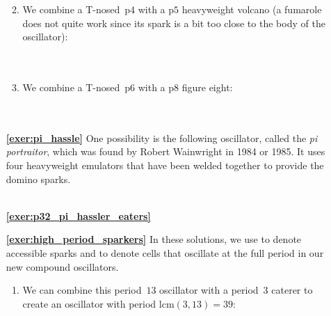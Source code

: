 \begin{multicols}{2}
\begin{itemize}[leftmargin=0em]
\begin{enumerate}[leftmargin=1.5em,label=\bf\color{ocre}(\alph*)]
			
			\item We combine a T-nosed~p$4$ with a p$5$ heavyweight volcano (a fumarole does not quite work since its spark is a bit too close to the body of the oscillator): \\[-0.6em]
			
			 \\[-0.8em]
			
			 \\
			
			\item We combine a T-nosed~p$6$ with a p$8$ figure eight: \\[-0.6em]
			
			 \\[-0.8em]
			
			 \\
		\end{enumerate}
		
		
		\item[\bf\color{ocre}\sffamily\ref{exer:pi_hassle}] One possibility is the following oscillator, called the \emph{pi portraitor}, which was found by Robert Wainwright in 1984 or 1985. It uses four heavyweight emulators that have been welded together to provide the domino sparks. \\[-0.6em]
		
		 \\
		
		
		\item[\bf\color{ocre}\sffamily\ref{exer:p32_pi_hassler_eaters}]  \\
		
		
		\item[\bf\color{ocre}\sffamily\ref{exer:high_period_sparkers}] In these solutions, we use  to denote accessible sparks and  to denote cells that oscillate at the full period in our new compound oscillators.
		\begin{enumerate}[leftmargin=1.5em,label=\bf\color{ocre}(\alph*)]
			\item We can combine this period~$13$ oscillator with a period~$3$ caterer to create an oscillator with period $\mathrm{lcm}(3,13) = 39$: \\[-0.6em]
			

\end{enumerate}
\end{itemize}
\end{multicols}
